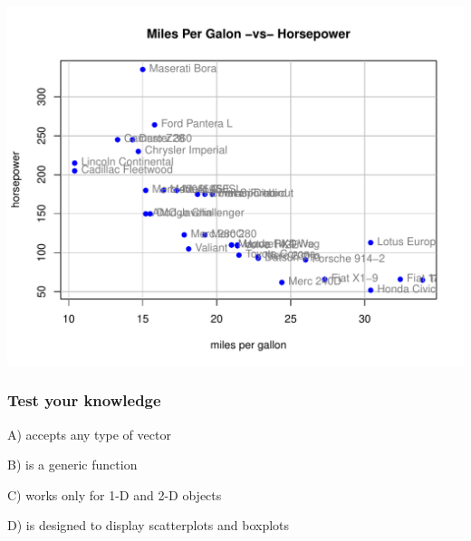 \documentclass[12pt]{beamer}\usepackage[]{graphicx}\usepackage[]{color}
\newenvironment{knitrout}{}{} %
\begin{document}
\begin{frame}[fragile]
\begin{knitrout}\footnotesize
{}\color{fgcolor}

{\centering \includegraphics[width=.8\linewidth,height=.7\linewidth]{figure/mtcars_plot2-1} 

}



\end{knitrout}
\end{frame}


\begin{frame}
\frametitle{Test your knowledge}

\bbi
  \item[A)] accepts any type of vector
  \item[B)] is a generic function
  \item[C)] works only for 1-D and 2-D objects
  \item[D)] is designed to display scatterplots and boxplots
\ei
\eb

\end{frame}

\end{document}
